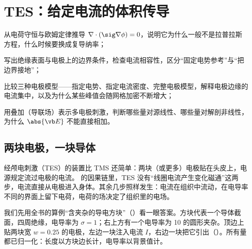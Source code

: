 \chapter{TES：给定电流的体积传导}\label{ch:tes}

\begin{chapterguide}
\begin{guidegoals}
\item 从电荷守恒与欧姆定律推导 $\nabla\cdot(\sig\nabla\phi)=0$，说明它为什么一般不是拉普拉斯方程，什么时候要换成复导纳率；
\item 写出绝缘表面与电极上的边界条件，检查电流相容性，区分“固定电势参考”与“把边界接地”；
\item 比较三种电极模型——指定电势、指定电流密度、完整电极模型，解释电极边缘的电流集中，以及为什么某些峰值会随网格加密不断增大；
\item 用叠加（导联场）表示多电极刺激，判断哪些量对源线性、哪些量对解剖非线性，为什么 $\abs{\vb E}$ 不能直接相加。
\end{guidegoals}
\end{chapterguide}

\section{两块电极，一块导体}\label{sec:tes-scene}

经颅电刺激（TES）的装置比 TMS 还简单：两块（或更多）电极贴在头皮上，电源规定流过电极的电流。 的因果链里，TES 没有“线圈电流产生变化磁通”这两步，电流直接从电极进入身体。其余几步照样发生：电流在组织中流动，在电导率不同的界面上留下电荷，电荷的场决定了组织里的电场。

我们先用全书的算例“含夹杂的导电方块”（）看一眼答案。方块代表一个导体截面，四周绝缘，电导率为 $\sigma=1$；右上方有一个电导率为 10 的圆形夹杂。顶边上贴两块宽 $w=0.25$ 的电极，左边一块注入电流 $I$，右边一块把它引出（）。所有量都已归一化：长度以方块边长计，电导率以背景值计。


